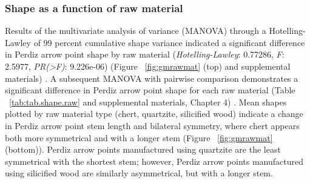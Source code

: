 \documentclass[review]{elsarticle}
\begin{document}
\subsubsection*{Shape as a function of raw material}

Results of the multivariate analysis of variance (MANOVA) through a Hotelling-Lawley of 99 percent cumulative shape variance indicated a significant difference in Perdiz arrow point shape by raw material (\textit{Hotelling-Lawley}: 0.77286, \textit{F}: 2.5977, \textit{PR(>F)}: 9.226e-06) (Figure ~\ref{fig:gmrawmat} (top) and supplemental materials) \citep[Chapter 4]{RN8980}. A subsequent MANOVA with pairwise comparison demonstrates a significant difference in Perdiz arrow point shape for each raw material (Table ~\ref{tab:tab.shape.raw} and supplemental materials, Chapter 4) \citep{RN8980}. Mean shapes plotted by raw material type (chert, quartzite, silicified wood) indicate a change in Perdiz arrow point stem length and bilateral symmetry, where chert appears both more symmetrical and with a longer stem (Figure ~\ref{fig:gmrawmat} (bottom)). Perdiz arrow points manufactured using quartzite are the least symmetrical with the shortest stem; however, Perdiz arrow points manufactured using silicified wood are similarly asymmetrical, but with a longer stem.
\end{document}
